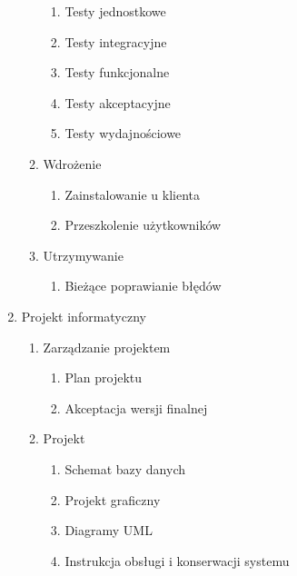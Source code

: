\begin{enumerate}
\begin{enumerate}
\begin{enumerate}
\item Testy jednostkowe
\item Testy integracyjne
\item Testy funkcjonalne
\item Testy akceptacyjne
\item Testy wydajnościowe

\end{enumerate}
\item Wdrożenie

\begin{enumerate}

\item Zainstalowanie u klienta
\item Przeszkolenie użytkowników

\end{enumerate}
\item Utrzymywanie

\begin{enumerate}

\item Bieżące poprawianie błędów

\end{enumerate}
\end{enumerate}




\item Projekt informatyczny

\begin{enumerate}

\item Zarządzanie projektem

\begin{enumerate}

\item Plan projektu
\item Akceptacja wersji finalnej

\end{enumerate}

\item Projekt

\begin{enumerate}

\item Schemat bazy danych
\item Projekt graficzny
\item Diagramy UML
\item Instrukcja obsługi i konserwacji systemu

\end{enumerate}


\end{enumerate}
\end{enumerate}
